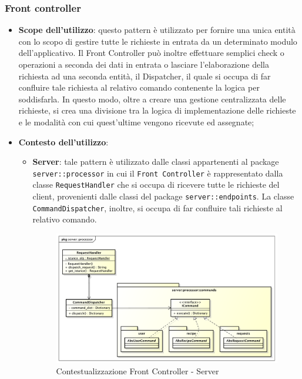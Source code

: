 	\subsubsection{Front controller} %
	\label{ssub:front_controller}
		\begin{itemize}
			\item \textbf{Scope dell'utilizzo}: questo pattern è utilizzato per fornire una unica entità con lo scopo di gestire tutte le richieste in entrata da un determinato modulo dell'applicativo. Il Front Controller può inoltre effettuare semplici check o operazioni a seconda dei dati in entrata o lasciare l'elaborazione della richiesta ad una seconda entità, il Dispatcher, il quale si occupa di far confluire tale richiesta al relativo comando contenente la logica per soddisfarla. In questo modo, oltre a creare una gestione centralizzata delle richieste, si crea una divisione tra la logica di implementazione delle richieste e le modalità con cui quest'ultime vengono ricevute ed assegnate;
			\item \textbf{Contesto dell'utilizzo}:
				\begin{itemize}
					\item \textbf{Server}: tale pattern è utilizzato dalle classi appartenenti al package \texttt{server::processor} in cui il \texttt{Front Controller} è rappresentato dalla classe \texttt{RequestHandler} che si occupa di ricevere tutte le richieste del client, provenienti dalle classi del package	\texttt{server::endpoints}. La classe \newline \texttt{CommandDispatcher}, inoltre, si occupa di far confluire tali richieste al relativo comando. \newline
					\begin{figure}[!htbp]
						\centering
						\centerline{\includegraphics[scale=0.40]{./images/design_pattern_server/dp_front_controller.pdf}}
						\caption{Contestualizzazione Front Controller - Server}
					\end{figure}
				\end{itemize}
		\end{itemize}

